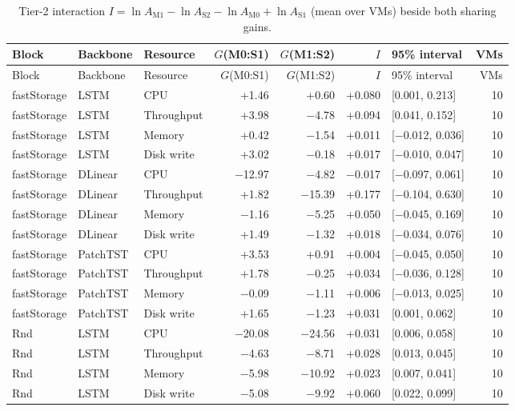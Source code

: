 \documentclass[a4paper,11pt]{article}
\begin{document}
\small
\setlength{\tabcolsep}{3pt}
\begin{longtable}{@{}lllrrrlr@{}}
\caption{Tier-2 interaction $I=\ln A_{\mathrm{M1}}-\ln A_{\mathrm{S2}}-\ln A_{\mathrm{M0}}+\ln A_{\mathrm{S1}}$ (mean over VMs) beside both sharing gains.}\label{tab:supp-t2-interaction}\\
\toprule
Block & Backbone & Resource & $G$(M0:S1) & $G$(M1:S2) & $I$ & 95\% interval & VMs \\
\midrule
\endfirsthead
\toprule
Block & Backbone & Resource & $G$(M0:S1) & $G$(M1:S2) & $I$ & 95\% interval & VMs \\
\midrule
\endhead
\bottomrule
\endfoot
fastStorage & LSTM & CPU & +1.46 & +0.60 & +0.080 & [0.001, 0.213] & 10 \\
fastStorage & LSTM & Throughput & +3.98 & $-$4.78 & +0.094 & [0.041, 0.152] & 10 \\
fastStorage & LSTM & Memory & +0.42 & $-$1.54 & +0.011 & [$-$0.012, 0.036] & 10 \\
fastStorage & LSTM & Disk write & +3.02 & $-$0.18 & +0.017 & [$-$0.010, 0.047] & 10 \\
fastStorage & DLinear & CPU & $-$12.97 & $-$4.82 & $-$0.017 & [$-$0.097, 0.061] & 10 \\
fastStorage & DLinear & Throughput & +1.82 & $-$15.39 & +0.177 & [$-$0.104, 0.630] & 10 \\
fastStorage & DLinear & Memory & $-$1.16 & $-$5.25 & +0.050 & [$-$0.045, 0.169] & 10 \\
fastStorage & DLinear & Disk write & +1.49 & $-$1.32 & +0.018 & [$-$0.034, 0.076] & 10 \\
fastStorage & PatchTST & CPU & +3.53 & +0.91 & +0.004 & [$-$0.045, 0.050] & 10 \\
fastStorage & PatchTST & Throughput & +1.78 & $-$0.25 & +0.034 & [$-$0.036, 0.128] & 10 \\
fastStorage & PatchTST & Memory & $-$0.09 & $-$1.11 & +0.006 & [$-$0.013, 0.025] & 10 \\
fastStorage & PatchTST & Disk write & +1.65 & $-$1.23 & +0.031 & [0.001, 0.062] & 10 \\
Rnd & LSTM & CPU & $-$20.08 & $-$24.56 & +0.031 & [0.006, 0.058] & 10 \\
Rnd & LSTM & Throughput & $-$4.63 & $-$8.71 & +0.028 & [0.013, 0.045] & 10 \\
Rnd & LSTM & Memory & $-$5.98 & $-$10.92 & +0.023 & [0.007, 0.041] & 10 \\
Rnd & LSTM & Disk write & $-$5.08 & $-$9.92 & +0.060 & [0.022, 0.099] & 10 \\

\end{longtable}
\end{document}
